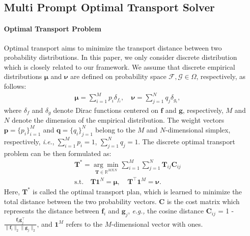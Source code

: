 \documentclass[nohyperref]{article}
\newcommand{\bs}{\boldsymbol}
\theoremstyle{plain}
\theoremstyle{definition}
\theoremstyle{remark}
\begin{document}
\subsection{Multi Prompt Optimal Transport Solver}
\label{MPOT}


\paragraph{Optimal Transport Problem}
Optimal transport aims to minimize the transport distance %
between two probability distributions. In this paper, we only consider discrete distribution which is closely related to our framework. We assume that discrete empirical distributions $\bs{\mu}$ and $\bs{\nu}$ are defined on probability space $\mathcal{F}, \mathcal{G} \in \Omega$, respectively, as follows:
\begin{align}
\bs{\mu} = \sum^{M}_{i=1} p_{i} \delta_{f_{i}}, \quad \bs{\nu} = \sum^{N}_{j=1} q_{j} \delta_{ g_{i}}, 
\end{align}
where $\delta_f$ and $\delta_g$ denote Dirac functions centered on $\bs{f}$ and $\bs{g}$, respectively, $M$ and $N$ denote the dimension of the empirical distribution. %
The weight vectors $\boldsymbol{p} = \{p_i\}^M_{i=1}$ and $\boldsymbol{q} = \{q_i\}^{N}_{j=1}$  belong to the $M$ and $N$-dimensional simplex, respectively, \textit{i.e.}, $\sum^{M}_{i=1} p_i = 1$, $\sum^{N}_{j=1} q_j = 1$. The discrete optimal transport problem  can be then formulated as: 
\begin{eqnarray}
\bs{T}^{\ast} = \underset{\bs{T}\in \mathbb{R}^{MXN}}{\arg{\min}} \sum^{M}_{i=1}\sum^{N}_{j=1}\bs{T}_{ij} \bs{C}_{ij} \nonumber \\ \textrm{s.t.} \quad \bs{T}\bs{1}^{N} = \bs{\mu}, \quad \bs{T}^{\top}\bs{1}^{M} = \bs{\nu} .
\label{DOT}
\end{eqnarray}
Here,
$\bs{T}^{\ast}$ is called the optimal transport plan, which is learned to minimize %
the total distance between the two probability vectors. $\bs{C}$ is the cost matrix which represents the distance between $\boldsymbol{f}_i$ and $\boldsymbol{g}_j$, \textit{e.g.,} the cosine distance $\bs{C}_{ij}$ = 1 - $\frac{\bs{f}_i\bs{g}^{\top}_j}{\|\bs{f}_i\|_2 \|\bs{g}_j\|_2}$, and $\bs{1}^{M}$ refers to the $M$-dimensional vector with ones. 
\end{document}
